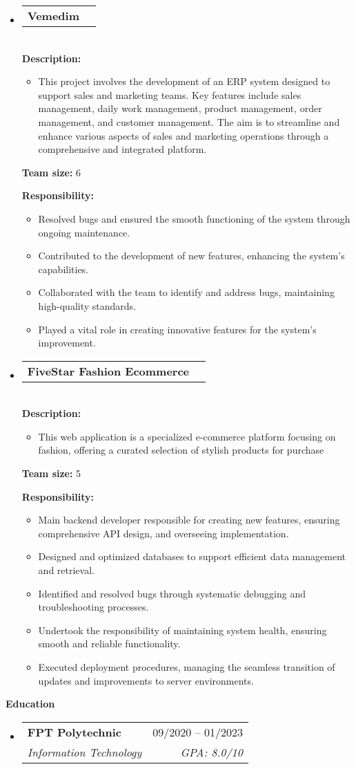 \documentclass[letterpaper,12pt]{article}[leftmargin=*]
\makeatletter
\def \entryspacing {-0pt}
\renewcommand{\section}[2]{\vspace{5pt}
  \colorbox{secondary}{\color{white}\raggedbottom\normalsize\textbf{{#1}{\hspace{7pt}#2}}}
}
\newcommand{\resumeEntryStart}{\begin{itemize}[leftmargin=2.5mm]}
\newcommand{\resumeEntryEnd}{\end{itemize}\vspace{\entryspacing}}
\newcommand{\resumeItemListStart}{\begin{itemize}[leftmargin=4.5mm]}
\newcommand{\resumeItemListEnd}{\end{itemize}}
\newcommand{\resumeItem}[1]{
  \item\small{
    {#1 \vspace{-2pt}}
  }
}
\newcommand{\resumeEntryTSDL}[4]{
  \vspace{-1pt}\item[]
    \begin{tabularx}{0.97\textwidth}{X@{\hspace{60pt}}r}
      \textbf{\color{primary}#1} & {\firabook\color{accent}\small#2} \\
      \textit{\color{accent}\small#3} & \textit{\color{accent}\small#4} \\
    \end{tabularx}\vspace{-6pt}
}
\newcommand{\resumeEntryTD}[2]{
  \vspace{-1pt}\item[]
    \begin{tabularx}{0.97\textwidth}{X@{\hspace{60pt}}r}
      \textbf{\color{primary}#1} & {\firabook\color{accent}\small#2} \\
    \end{tabularx}\vspace{-6pt}
}
\makeatother
\begin{document}
    \resumeEntryStart
    \resumeEntryTD
      {Vemedim}{}

        \textbf{\\Description: }
        
            \resumeItemListStart
              \resumeItem {This project involves the development of an ERP system designed to support sales and marketing teams. Key features include sales management, daily work management, product management, order management, and customer management. The aim is to streamline and enhance various aspects of sales and marketing operations through a comprehensive and integrated platform.}
            \resumeItemListEnd


        \textbf{Team size: }6

        
        \textbf{Responsibility: }
            \resumeItemListStart
                \resumeItem{Resolved bugs and ensured the smooth functioning of the system through ongoing maintenance.}
                \resumeItem{Contributed to the development of new features, enhancing the system's capabilities.}
                \resumeItem{Collaborated with the team to identify and address bugs, maintaining high-quality standards.}
                \resumeItem{Played a vital role in creating innovative features for the system's improvement.}
            \resumeItemListEnd
  \resumeEntryEnd

  \resumeEntryStart
    \resumeEntryTD
      { FiveStar Fashion Ecommerce}{}

        \textbf{\\Description: }
        
            \resumeItemListStart
              \resumeItem {This web application is a specialized e-commerce platform focusing on fashion, offering a curated selection of stylish products for purchase}
            \resumeItemListEnd


        \textbf{Team size: }5

        
        \textbf{Responsibility: }
            \resumeItemListStart
                \resumeItem{Main backend developer responsible for creating new features, ensuring comprehensive API design, and overseeing implementation.}
                \resumeItem{Designed and optimized databases to support efficient data management and retrieval.}
                \resumeItem{Identified and resolved bugs through systematic debugging and troubleshooting processes.}
                \resumeItem{Undertook the responsibility of maintaining system health, ensuring smooth and reliable functionality.}
                \resumeItem{Executed deployment procedures, managing the seamless transition of updates and improvements to server environments.}
            \resumeItemListEnd
  \resumeEntryEnd

\section{\faGraduationCap}{Education}

  \resumeEntryStart
    \resumeEntryTSDL
      {FPT Polytechnic}{09/2020 -- 01/2023}
      {Information Technology}{GPA: 8.0/10}
  \resumeEntryEnd
\end{document}

